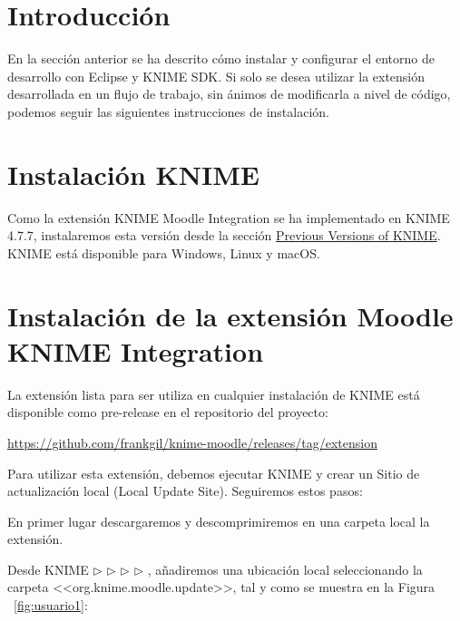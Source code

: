 \label{sec:appendixE}

\section{Introducción}

En la sección anterior se ha descrito cómo instalar y configurar el entorno de desarrollo con Eclipse y KNIME SDK. Si solo se desea
utilizar la extensión desarrollada en un flujo de trabajo, sin ánimos de modificarla a nivel de código, podemos seguir las siguientes instrucciones
de instalación. 

\section{Instalación KNIME}

Como la extensión KNIME Moodle Integration se ha implementado en KNIME 4.7.7, instalaremos esta versión desde la sección \href{https://www.knime.com/download-previous-versions}{Previous Versions of KNIME}. 
KNIME está disponible para Windows, Linux y macOS.


\section{Instalación de la extensión Moodle KNIME Integration}

La extensión lista para ser utiliza en cualquier instalación de KNIME está disponible como pre-release en el repositorio del proyecto: 

\url{https://github.com/frankgil/knime-moodle/releases/tag/extension}

Para utilizar esta extensión, debemos ejecutar KNIME y crear un Sitio de actualización local 
(Local Update Site). Seguiremos estos pasos:
\

En primer lugar descargaremos y descomprimiremos en una carpeta local la extensión. 
\

Desde KNIME $\triangleright$  $\triangleright$  $\triangleright$  $\triangleright$ , añadiremos 
una ubicación local seleccionando la carpeta <<org.knime.moodle.update>>, tal y como se muestra en la Figura ~\ref{fig:usuario1}: 

